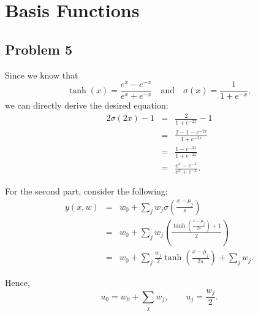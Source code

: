 \section{Basis Functions}

\subsection*{Problem 5}
Since we know that \[\tanh(x) = \frac{e^x - e^{-x}}{e^x + e^{-x}} \quad \textrm{and} \quad \sigma(x) = \frac{1}{1 + e^{-x}},\]
we can directly derive the desired equation:
\begin{eqnarray*}
2\sigma(2x)-1 &=& \frac{2}{1 + e^{-2x}} - 1 \\
              &=& \frac{2 - 1 - e^{-2x}}{1 + e^{-2x}} \\
              &=& \frac{1 - e^{-2x}}{1 + e^{-2x}} \\
              &=& \frac{e^x - e^{-x}}{e^x + e^{-x}}.
\end{eqnarray*}

For the second part, consider the following:
\begin{eqnarray*}
  y(x,w) &=& w_0 + \sum_jw_j\sigma\left(\frac{x-\mu_j}{s}\right) \\
         &=& w_0 + \sum_jw_j\left(\frac{\tanh\left(\frac{x-\mu_j}{2s}\right) + 1}{2} \right)\\
         &=& w_0 + \sum_j\frac{w_j}{2}\tanh\left(\frac{x-\mu_j}{2s}\right)  + \sum_jw_j.
\end{eqnarray*}

Hence, \[ u_0 = w_0 + \sum_jw_j, \qquad u_j = \frac{w_j}{2}.\]
